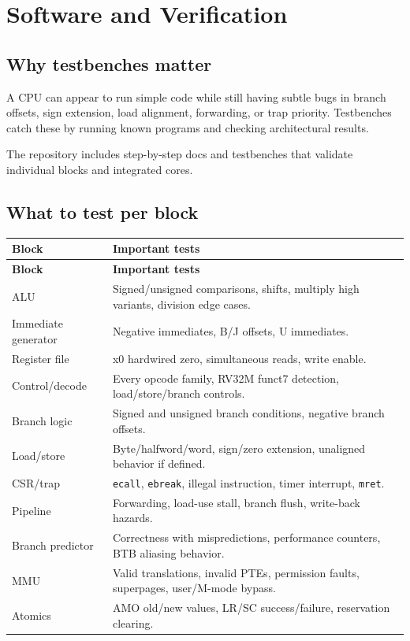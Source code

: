 \section{Software and Verification}

\subsection{Why testbenches matter}

A CPU can appear to run simple code while still having subtle bugs in branch offsets, sign extension, load alignment, forwarding, or trap priority. Testbenches catch these by running known programs and checking architectural results.

The repository includes step-by-step docs and testbenches that validate individual blocks and integrated cores.

\subsection{What to test per block}

\begin{longtable}{|>{\RaggedRight\arraybackslash}p{}|>{\RaggedRight\arraybackslash}p{}|}
\hline
\textbf{Block} & \textbf{Important tests} \\
\hline
\endfirsthead
\hline
\textbf{Block} & \textbf{Important tests} \\
\hline
\endhead
ALU & Signed/unsigned comparisons, shifts, multiply high variants, division edge cases. \\
\hline
Immediate generator & Negative immediates, B/J offsets, U immediates. \\
\hline
Register file & x0 hardwired zero, simultaneous reads, write enable. \\
\hline
Control/decode & Every opcode family, RV32M funct7 detection, load/store/branch controls. \\
\hline
Branch logic & Signed and unsigned branch conditions, negative branch offsets. \\
\hline
Load/store & Byte/halfword/word, sign/zero extension, unaligned behavior if defined. \\
\hline
CSR/trap & \texttt{ecall}, \texttt{ebreak}, illegal instruction, timer interrupt, \texttt{mret}. \\
\hline
Pipeline & Forwarding, load-use stall, branch flush, write-back hazards. \\
\hline
Branch predictor & Correctness with mispredictions, performance counters, BTB aliasing behavior. \\
\hline
MMU & Valid translations, invalid PTEs, permission faults, superpages, user/M-mode bypass. \\
\hline
Atomics & AMO old/new values, LR/SC success/failure, reservation clearing. \\
\hline
\end{longtable}

